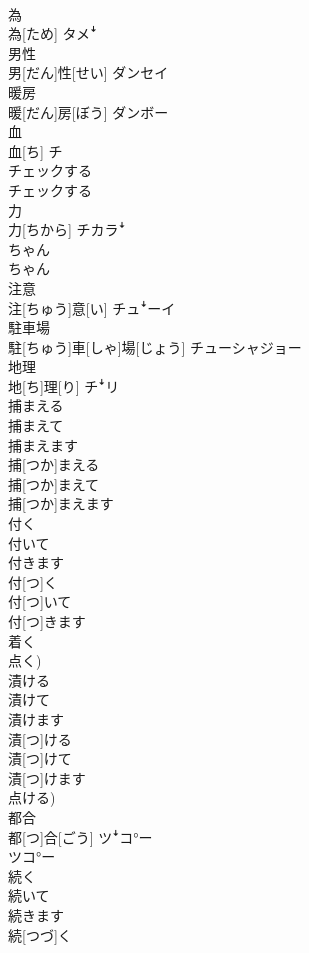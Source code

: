 \documentclass[8pt]{extreport}
\begin{document}
\begin{CJK}{UTF8}{min}
\\	為	
\\	為[ため]	タメꜜ
\\	男性	
\\	男[だん]性[せい]	ダンセイ
\\	暖房	
\\	暖[だん]房[ぼう]	ダンボー
\\	血	
\\	血[ち]	チ
\\	チェックする	
\\	チェックする	
\\	力	
\\	力[ちから]	チカラꜜ
\\	ちゃん	
\\	ちゃん	
\\	注意	
\\	注[ちゅう]意[い]	チュꜜーイ
\\	駐車場	
\\	駐[ちゅう]車[しゃ]場[じょう]	チューシャジョー
\\	地理	
\\	地[ち]理[り]	チꜜリ
\\	捕まえる 
\\	捕まえて 
\\	捕まえます	
\\	捕[つか]まえる 
\\	捕[つか]まえて 
\\	捕[つか]まえます	
\\	付く 
\\	付いて 
\\	付きます	
\\	付[つ]く 
\\	付[つ]いて 
\\	付[つ]きます 
\\	着く 
\\	点く)	
\\	漬ける 
\\	漬けて 
\\	漬けます	
\\	漬[つ]ける 
\\	漬[つ]けて 
\\	漬[つ]けます 
\\	点ける)	
\\	都合	
\\	都[つ]合[ごう]	ツꜜコ°ー 
\\	ツコ°ー
\\	続く 
\\	続いて 
\\	続きます	
\\	続[つづ]く 

\end{CJK}
\end{document}

